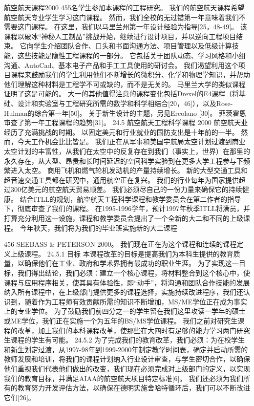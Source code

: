 \documentclass[UTF8,11pt,a4paper,openany,fontset=fandol]{ctexbook}
\begin{document}
航空航天课程2000 455名学生参加本课程的工程研究。 我们的航空航天课程希望航空航天专业学生学习这门课程。 然而，我们全校的无过错第一年意味着我们不需要这门课程。 在这里，我们以马里兰州第一年设计经验为指导[25，48-49]。 该课程以破冰“神秘人工制品”挑战开始，继续进行设计项目，并以逆向工程项目结束。 它向学生介绍团队合作、口头和书面沟通方法、项目管理以及低级计算技能，这些技能是隐性工程课程的一部分。 它包括关于团队动态、学习风格和小组沟通、AutoCad、基本电子产品和手工工具使用的研讨会。 我们渴望利用这个项目课程来鼓励我们的学生利用他们不断增长的微积分、化学和物理学知识，并帮助他们理解这种材料是工程学不可或缺的，而不是无关的。 马里兰大学的类似课程证明了这是可能的。 大一的其他值得注意的课程变化包括Drexel的E4课程（将基础、设计和实验室与工程研究所需的数学和科学相结合[20，46]），以及Rose-Hulman的综合第一年[50]。 关于新生设计的主题，另见Ercolano [30]。 菲茨霍恩审查了第一年工程课程的趋势[31]。 24.5 航空航天工程科学课程 2000 航空航天业经历了充满挑战的时期。 以固定美元和行业就业的国防支出是十年前的一半。 然而，今天工作机会比比皆是。 我们正在从军事和美国宇航局太空计划过渡到商业太空计划的丰富性，从我们在太空中的反复存在到我们（事实上，世界）在那里的永久存在，从大型、昂贵和长时间延迟的空间科学实验到在更多大学工程参与下频繁进入太空。 商用飞机和燃气轮机发动机的产量持续增长。 新的大型交通工具和超音速交通工具都在研究中，通用航空正在复兴。 我们的行业每年为国家提供超过300亿美元的航空航天贸易顺差。 我们必须尽自己的一份力量来确保它的持续健康。 结合ITLL的规划，航空航天工程科学课程和教学委员会在第二作者的指导下，彻底审查了我们的课程。 在1995-1996学年，预计1997年秋季ITLL将满员，并打算充分利用这一设施，课程和教学委员会提出了一个全新的大二和不同的上级课程。 今年秋天，我们将为我们的毕业班实施新的大二课程

456 SEEBASS \& PETERSON 2000。 我们现在正在为这个课程和连续的课程定义上级课程。 24.5.1 目标 本课程改革的目标是提高我们为本科生提供的教育质量，以确保他们在工业、政府和学术界拥有最成功的职业生涯。 为了实现这一目标，我们得出结论，我们必须：建立一个核心课程，将材料整合到这个核心中，使课程与应用程序相关，使其具有体验性，即“动手”，将沟通和团队合作技能的发展纳入所有课程中，在上级部门提供更多的课程选择，实施持续改进程序，我们还认识到，随着作为工程师有效贡献所需的知识不断增加，MS/ME学位正在成为事实上的专业学位。 为了鼓励我们前四分之一的学生留在我们这里攻读一学年的硕士或ME学位，我们正在实施一个为五年的BS/MS学位课程。 我们之前对研究生课程的改革，加上我们的本科课程改革，使那些在大四时有足够的能力学习两门研究生课程的学生有可能。 24.5.2 为了完成我们的教育改革，我们必须：为在校学生和新生划定过渡，从1997-98年到1999-2000年制定教学时间表，确定并启动所需的教师发展和培训，将我们的课程计划纳入行业设计审查，与学生密切合作，以确保他们重视我们代表他们做出的改变，我们现在必须完成对上级部门的定义，以实现我们的教育目标，并满足AIAA的航空航天项目特定标准[6]。 我们还必须为我们所有的教育努力开发评估方法，以确保在德明实施舍哈特循环后，我们可以不断改进它们[26]。
\end{document}
